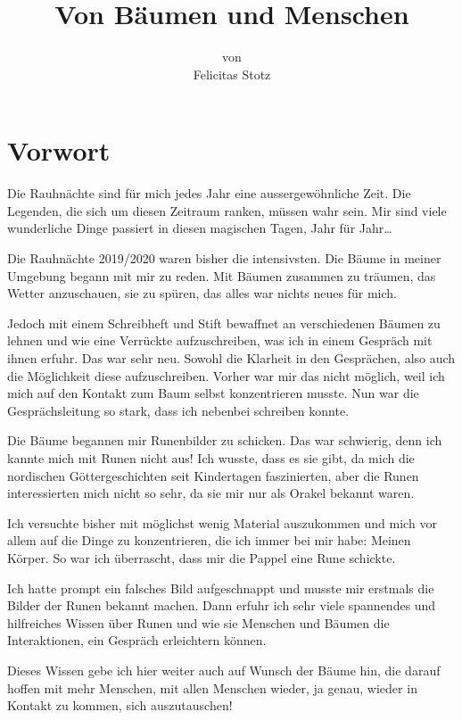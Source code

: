 \documentclass[11pt,titlepage,a5paper]{book}
\author{von\\[0.8ex]Felicitas Stotz}
\title{\bf\Huge Von Bäumen und Menschen}
\begin{document}
\maketitle

\chapter{Vorwort}


Die Rauhnächte sind für mich jedes Jahr eine aussergewöhnliche Zeit. Die Legenden, die sich um diesen Zeitraum ranken, müssen wahr sein. Mir sind viele wunderliche Dinge passiert in diesen magischen Tagen, Jahr für Jahr\dots

Die Rauhnächte 2019/2020 waren bisher die intensivsten. Die Bäume in meiner Umgebung begann mit mir zu reden. Mit Bäumen zusammen zu träumen, das Wetter anzuschauen, sie zu spüren, das alles war nichts neues für mich.

Jedoch mit einem Schreibheft und Stift bewaffnet an verschiedenen Bäumen zu lehnen und wie eine Verrückte aufzuschreiben, was ich in einem Gespräch mit ihnen erfuhr. Das war sehr neu. Sowohl die Klarheit in den Gesprächen, also auch die Möglichkeit diese aufzuschreiben. Vorher war mir das nicht möglich, weil ich mich auf den Kontakt zum Baum selbst konzentrieren musste. Nun war die Gesprächsleitung so stark, dass ich nebenbei schreiben konnte.

Die Bäume begannen mir Runenbilder zu schicken. Das war schwierig, denn ich kannte mich mit Runen nicht aus! Ich wusste, dass es sie gibt, da mich die nordischen Göttergeschichten seit Kindertagen faszinierten, aber die Runen interessierten mich nicht so sehr, da sie mir nur als Orakel bekannt waren.

Ich versuchte bisher mit möglichst wenig Material auszukommen und mich vor allem auf die Dinge zu konzentrieren, die ich immer bei mir habe: Meinen Körper. So war ich überrascht, dass mir die Pappel eine Rune schickte.

Ich hatte prompt ein falsches Bild aufgeschnappt und musste mir erstmals die Bilder der Runen bekannt machen. Dann erfuhr ich sehr viele spannendes und hilfreiches Wissen über Runen und wie sie Menschen und Bäumen die Interaktionen, ein Gespräch erleichtern können.

Dieses Wissen gebe ich hier weiter auch auf Wunsch der Bäume hin, die darauf hoffen mit mehr Menschen, mit allen Menschen wieder, ja genau, wieder in Kontakt zu kommen, sich auszutauschen!
\end{document}
